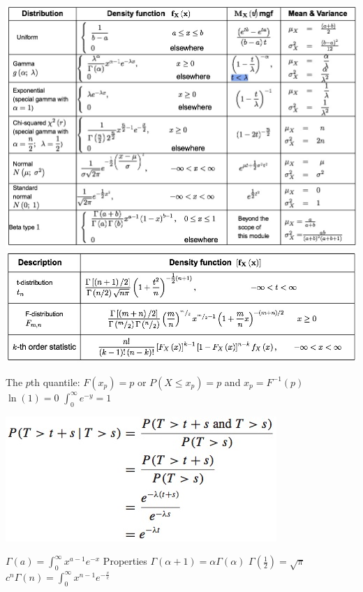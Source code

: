 \documentclass{/out/app/latex/examnotes}
\begin{document}
{\includegraphics[scale=0.5]{./img/cont.jpg}
\includegraphics[scale=0.5]{./img/dent.jpg}


\ra The $p$th quantile: $F(x_p)=p$ \quad or $P(X\le x_p)=p$ \quad and $x_p=F^{-1}(p)$
\ra $\ln(1)=0$
\vspace{6pt}
\ra $\displaystyle\int_0^\infty e^{-y} = 1$


\includegraphics[scale=0.5]{./img/2memoryless.jpg}


\vspace{6pt}
$\Gamma(a)=\displaystyle\int_0^\infty{x^{a-1}e^{-x}}$ \quad Properties $\Gamma(\alpha+1)=\alpha\Gamma(\alpha)$ \quad $\Gamma(\frac{1}{2})=\sqrt{\pi}$
$c^n\Gamma(n)=\displaystyle\int_0^\infty{x^{n-1}e^{-\displaystyle\frac{x}{c}}}$

}
\end{document}
